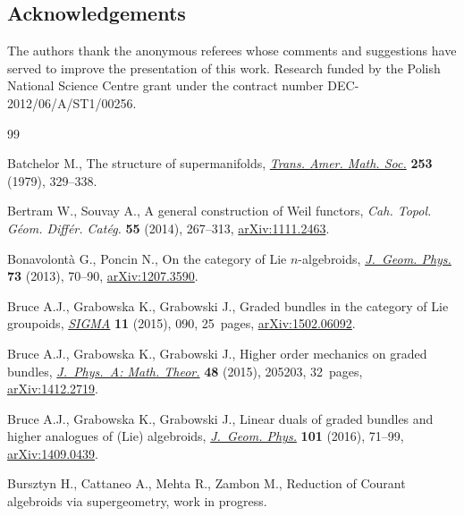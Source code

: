 \documentclass[pdftex]{sigma}
\numberwithin{equation}{section}
\begin{document}
\subsection*{Acknowledgements}
The authors thank the anonymous referees whose comments and suggestions have served to improve the presentation of this work. Research funded by the Polish National Science Centre grant under the contract number DEC-2012/06/A/ST1/00256.

\begin{thebibliography}{99}
\footnotesize\itemsep=0pt

Batchelor M., The structure of supermanifolds, \href{http://dx.doi.org/10.2307/1998201}{\textit{Trans. Amer. Math. Soc.}}
  \textbf{253} (1979), 329--338.

Bertram W., Souvay A., A general construction of {W}eil functors, \textit{Cah.
  Topol. G\'eom. Diff\'er. Cat\'eg.} \textbf{55} (2014), 267--313,
  \href{http://arxiv.org/abs/1111.2463}{arXiv:1111.2463}.

Bonavolont{\`a} G., Poncin N., On the category of {L}ie {$n$}-algebroids,
  \href{http://dx.doi.org/10.1016/j.geomphys.2013.05.004}{\textit{J.~Geom. Phys.}} \textbf{73} (2013), 70--90, \href{http://arxiv.org/abs/1207.3590}{arXiv:1207.3590}.

Bruce A.J., Grabowska K., Grabowski J., Graded bundles in the category of {L}ie
  groupoids, \href{http://dx.doi.org/10.3842/SIGMA.2015.090}{\textit{SIGMA}} \textbf{11} (2015), 090, 25~pages,
  \href{http://arxiv.org/abs/1502.06092}{arXiv:1502.06092}.

Bruce A.J., Grabowska K., Grabowski J., Higher order mechanics on graded
  bundles, \href{http://dx.doi.org/10.1088/1751-8113/48/20/205203}{\textit{J.~Phys.~A: Math. Theor.}} \textbf{48} (2015), 205203,
  32~pages, \href{http://arxiv.org/abs/1412.2719}{arXiv:1412.2719}.

Bruce A.J., Grabowska K., Grabowski J., Linear duals of graded bundles and
  higher analogues of ({L}ie) algebroids, \href{http://dx.doi.org/10.1016/j.geomphys.2015.12.004}{\textit{J.~Geom. Phys.}} \textbf{101}
  (2016), 71--99, \href{http://arxiv.org/abs/1409.0439}{arXiv:1409.0439}.

Bursztyn H., Cattaneo A., Mehta R., Zambon M., Reduction of Courant algebroids
  via supergeometry, work in progress.


\end{thebibliography}
\end{document}
